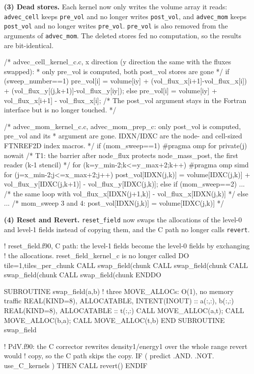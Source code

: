 \documentclass[a4paper,11pt]{article}
\newcommand{\kernel}[1]{\texttt{#1}}
\begin{document}
\textbf{(3) Dead stores.}
Each kernel now only writes the volume array it reads: \kernel{advec\_cell} keeps \texttt{pre\_vol} and no longer writes \texttt{post\_vol}, and \kernel{advec\_mom} keeps \texttt{post\_vol} and no longer writes \texttt{pre\_vol}.
\texttt{pre\_vol} is also removed from the arguments of \kernel{advec\_mom}.
The deleted stores fed no computation, so the results are bit-identical.
\begin{code}
/* advec_cell_kernel_c.c, x direction (y direction the same with the fluxes swapped):
 * only pre_vol is computed, both post_vol stores are gone */
if (sweep_number==1)
  pre_vol[i] = volume[iy] + (vol_flux_x[i+1]-vol_flux_x[i]) + (vol_flux_y[(j,k+1)]-vol_flux_y[iy]);
else
  pre_vol[i] = volume[iy] + vol_flux_x[i+1] - vol_flux_x[i];
/* The post_vol argument stays in the Fortran interface but is no longer touched. */
\end{code}
\begin{code}
/* advec_mom_kernel_c.c, advec_mom_prep_c: only post_vol is computed, pre_vol and its
 * argument are gone. IDXN/IDXC are the node- and cell-sized FTNREF2D index macros. */
if (mom_sweep==1) {
#pragma omp for private(j) nowait   /* T1: the barrier after node_flux protects
                                       node_mass_post, the first reader (k-1 stencil) */
  for (k=y_min-2;k<=y_max+2;k++)
#pragma omp simd
    for (j=x_min-2;j<=x_max+2;j++)
      post_vol[IDXN(j,k)] = volume[IDXC(j,k)] + vol_flux_y[IDXC(j,k+1)] - vol_flux_y[IDXC(j,k)];
} else if (mom_sweep==2) {
  ...   /* the same loop with vol_flux_x[IDXN(j+1,k)] - vol_flux_x[IDXN(j,k)] */
} else {
  ...   /* mom_sweep 3 and 4: post_vol[IDXN(j,k)] = volume[IDXC(j,k)] */
}
\end{code}

\textbf{(4) Reset and Revert.}
\kernel{reset\_field} now swaps the allocations of the level-0 and level-1 fields instead of copying them, and the C path no longer calls \kernel{revert}.
\begin{code}[language={[90]Fortran}]
! reset_field.f90, C path: the level-1 fields become the level-0 fields by exchanging
! the allocations. reset_field_kernel_c is no longer called
DO tile=1,tiles_per_chunk
  CALL swap_field(chunk%
  CALL swap_field(chunk%
  CALL swap_field(chunk%
  CALL swap_field(chunk%
ENDDO

SUBROUTINE swap_field(a,b)              ! three MOVE_ALLOCs: O(1), no memory traffic
  REAL(KIND=8), ALLOCATABLE, INTENT(INOUT) :: a(:,:), b(:,:)
  REAL(KIND=8), ALLOCATABLE :: t(:,:)
  CALL MOVE_ALLOC(a,t); CALL MOVE_ALLOC(b,a); CALL MOVE_ALLOC(t,b)
END SUBROUTINE swap_field

! PdV.f90: the C corrector rewrites density1/energy1 over the whole range revert would
! copy, so the C path skips the copy.
IF ( predict .AND. .NOT. use_C_kernels ) THEN
  CALL revert()
ENDIF
\end{code}
\end{document}
